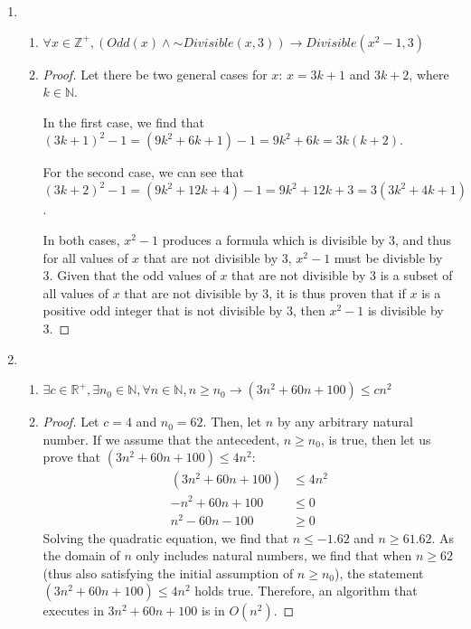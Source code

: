 \documentclass[11pt, notitlepage, leqno]{article}
\renewcommand{\neg}{\mathord{\sim}}
\begin{document}
\begin{enumerate}
\begin{enumerate}
\end{enumerate}

\item \begin{enumerate}

\item $\forall x \in \mathbb{Z}^{+}, (Odd(x) \wedge \neg Divisible(x, 3)) \to Divisible(x^2-1, 3)$

\item \begin{proof} Let there be two general cases for $x$: $x=3k+1$ and $3k+2$, where $k \in \mathbb{N}$.

In the first case, we find that $(3k+1)^2 - 1 = (9k^2 + 6k + 1) - 1 = 9k^2 + 6k = 3k(k+2)$.

For the second case, we can see that $(3k+2)^2 - 1 = (9k^2 + 12k +4) - 1 = 9k^2 + 12k + 3 = 3(3k^2 + 4k + 1)$.

In both cases, $x^2-1$ produces a formula which is divisible by 3, and thus for all values of $x$ that are not divisible by 3, $x^2-1$ must be divisble by 3. Given that the odd values of $x$ that are not divisible by 3 is a subset of all values of $x$ that are not divisible by 3, it is thus proven that if $x$ is a positive odd integer that is not divisible by 3, then $x^2-1$ is divisible by 3.
\end{proof}

\end{enumerate}

\item \begin{enumerate}

\item $\exists c \in \mathbb{R}^{+}, \exists n_0 \in \mathbb{N}, \forall n \in \mathbb{N}, n \geq n_0 \to (3n^2 + 60 n + 100) \leq cn^2$

\item \begin{proof}
Let $c=4$ and $n_0 = 62$. Then, let $n$ by any arbitrary natural number. If we assume that the antecedent, $n \geq n_0$, is true, then let us prove that $ (3n^2 + 60 n + 100) \leq 4n^2$:
\begin{align*}
	 (3n^2 + 60 n + 100) &\leq 4n^2\\
	 -n^2 + 60 n + 100 &\leq 0\\
	 n^2 - 60n - 100 &\geq 0 
\end{align*}
Solving the quadratic equation, we find that $n \leq -1.62$ and $n \geq 61.62$. As the domain of $n$ only includes natural numbers, we find that when $n \geq 62$ (thus also satisfying the initial assumption of $n \geq n_0$), the statement $ (3n^2 + 60 n + 100) \leq 4n^2$ holds true. Therefore, an algorithm that executes in $3n^2 + 60 n + 100$ is in $O(n^2)$.
\end{proof}

\end{enumerate}

\end{enumerate}
\end{document}
